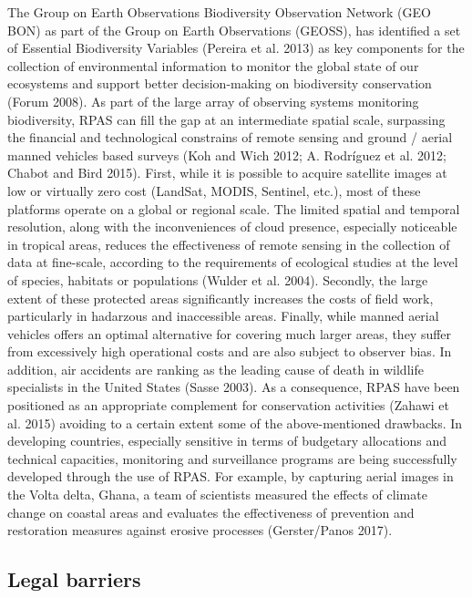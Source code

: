 \documentclass[]{interact}
\theoremstyle{plain}%
\theoremstyle{definition}
\theoremstyle{remark}
\begin{document}
The Group on Earth Observations Biodiversity Observation Network (GEO
BON) as part of the Group on Earth Observations (GEOSS), has identified
a set of Essential Biodiversity Variables (Pereira et al. 2013) as key
components for the collection of environmental information to monitor
the global state of our ecosystems and support better decision-making on
biodiversity conservation (Forum 2008). As part of the large array of
observing systems monitoring biodiversity, RPAS can fill the gap at an
intermediate spatial scale, surpassing the financial and technological
constrains of remote sensing and ground / aerial manned vehicles based
surveys (Koh and Wich 2012; A. Rodríguez et al. 2012; Chabot and Bird
2015). First, while it is possible to acquire satellite images at low or
virtually zero cost (LandSat, MODIS, Sentinel, etc.), most of these
platforms operate on a global or regional scale. The limited spatial and
temporal resolution, along with the inconveniences of cloud presence,
especially noticeable in tropical areas, reduces the effectiveness of
remote sensing in the collection of data at fine-scale, according to the
requirements of ecological studies at the level of species, habitats or
populations (Wulder et al. 2004). Secondly, the large extent of these
protected areas significantly increases the costs of field work,
particularly in hadarzous and inaccessible areas. Finally, while manned
aerial vehicles offers an optimal alternative for covering much larger
areas, they suffer from excessively high operational costs and are also
subject to observer bias. In addition, air accidents are ranking as the
leading cause of death in wildlife specialists in the United States
(Sasse 2003). As a consequence, RPAS have been positioned as an
appropriate complement for conservation activities (Zahawi et al. 2015)
avoiding to a certain extent some of the above-mentioned drawbacks. In
developing countries, especially sensitive in terms of budgetary
allocations and technical capacities, monitoring and surveillance
programs are being successfully developed through the use of RPAS. For
example, by capturing aerial images in the Volta delta, Ghana, a team of
scientists measured the effects of climate change on coastal areas and
evaluates the effectiveness of prevention and restoration measures
against erosive processes (Gerster/Panos 2017).

\subsection{Legal barriers}\label{legal-barriers}
\end{document}
